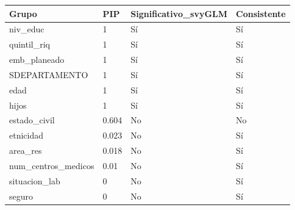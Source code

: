 \begin{tabular}{llll}
  \toprule
Grupo & PIP & Significativo\_svyGLM & Consistente \\ 
  \midrule
niv\_educ & 1 & Sí & Sí \\ 
  quintil\_riq & 1 & Sí & Sí \\ 
  emb\_planeado & 1 & Sí & Sí \\ 
  SDEPARTAMENTO & 1 & Sí & Sí \\ 
  edad & 1 & Sí & Sí \\ 
  hijos & 1 & Sí & Sí \\ 
  estado\_civil & 0.604 & No & No \\ 
  etnicidad & 0.023 & No & Sí \\ 
  area\_res & 0.018 & No & Sí \\ 
  num\_centros\_medicos & 0.01 & No & Sí \\ 
  situacion\_lab & 0 & No & Sí \\ 
  seguro & 0 & No & Sí \\ 
   \bottomrule
\end{tabular}
